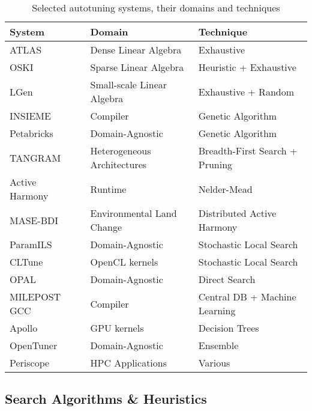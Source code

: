 \begin{table}[htpb]
    \centering
    \begin{tabular}{@{}lll@{}}
        \toprule
        System & Domain & Technique \\ \midrule
        ATLAS~\cite{dongarra1998automatically} & Dense Linear Algebra & Exhaustive \\
        OSKI~\cite{vuduc2005oski} & Sparse Linear Algebra & Heuristic + Exhaustive \\
        LGen~\cite{spampinato2014basic} & Small-scale Linear Algebra & Exhaustive + Random \\
        INSIEME~\cite{jordan2012multi} & Compiler & Genetic Algorithm \\
        Petabricks~\cite{ansel2009petabricks} & Domain-Agnostic & Genetic Algorithm\\
        TANGRAM~\cite{chang2016efficient} & Heterogeneous Architectures & Breadth-First Search + Pruning \\
        Active Harmony~\cite{tapus2002active} & Runtime & Nelder-Mead \\
        MASE-BDI~\cite{coelho2016mase} & Environmental Land Change & Distributed Active Harmony~\cite{tapus2002active} \\
        ParamILS~\cite{hutter2009paramils} & Domain-Agnostic & Stochastic Local Search \\
        CLTune~\cite{nugteren2015cltune} & OpenCL kernels & Stochastic Local Search\\
        OPAL~\cite{audet2014optimization} & Domain-Agnostic & Direct Search \\
        MILEPOST GCC~\cite{fursin2011milepost} & Compiler & Central DB + Machine Learning \\
        Apollo~\cite{beckingsale2017apollo} & GPU kernels & Decision Trees \\
        OpenTuner~\cite{ansel2014opentuner} & Domain-Agnostic & Ensemble \\
        Periscope~\cite{gerndt2017multi} & HPC Applications & Various \\
        \bottomrule
    \end{tabular}
    \caption{Selected autotuning systems, their domains and techniques}
    \label{tab:systems}
\end{table}

\subsection{Search Algorithms \& Heuristics}


